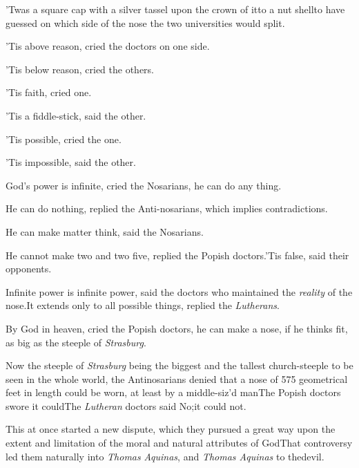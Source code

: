 \documentclass{article}
\begin{document}
\vskip -2pt

’Twas a square cap with a silver tassel upon the crown of
it\tsk to a nut shell\tsk\break to have guessed on which side of the
nose the two universities would split.

\vskip -2pt

’Tis above reason, cried the doctors on one side.

\vskip -2pt

’Tis below reason, cried the others.

\vskip -2pt

’Tis faith, cried one.

’Tis a fiddle-stick, said the other.

’Tis possible, cried the one.

’Tis impossible, said the other.

God’s power is infinite, cried the No\-sarians, he can do
any thing.

He can do nothing, replied the Anti-nosarians, which implies
contradictions.

He can make matter think, said the Nosarians.


\break
{}

He cannot make two and two five, replied the Popish
doctors.\tsh ’Tis false, said their opponents.\tsk

Infinite power is infinite power, said the doctors who
maintained the \textit{reality}
of the nose.\tsh It extends only to
all possible things, replied the \textit{Lutherans}.

By God in heaven, cried the Popish doctors, he can make a nose,
if he thinks fit, as big as the steeple of \textit{Strasburg}.

Now the steeple of \textit{Strasburg} being the biggest and the
tallest church-steeple to be seen in the whole world, the
Antino\-sarians denied that a nose of 575 geome\-trical feet in length
could be worn, at least by a middle-siz’d
man\tsk The Popish doctors swore it could\tsk The
\textit{Lutheran} doctors said No;\tsk it could not.

This at once started a new dispute, which they pursued a great
way upon the extent and limitation of the moral and natural
attributes of God\tsk That controversy led them naturally into
\textit{Thomas} \textit{Aquinas}, and \textit{Thomas
Aquinas} to the\break devil.
\end{document}
